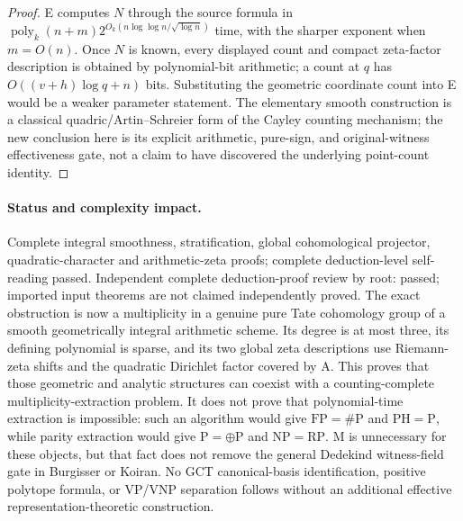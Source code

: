 \begin{proof}
E computes $N$ through the source formula in $\operatorname{poly}_k(n+m)2^{O_k(n\log\log n/\sqrt{\log n})}$ time, with the sharper exponent when $m=O(n)$. Once $N$ is known, every displayed count and compact zeta-factor description is obtained by polynomial-bit arithmetic; a count at $q$ has $O((v+h)\log q+n)$ bits. Substituting the geometric coordinate count into E would be a weaker parameter statement. The elementary smooth construction is a classical quadric/Artin--Schreier form of the Cayley counting mechanism; the new conclusion here is its explicit arithmetic, pure-sign, and original-witness effectiveness gate, not a claim to have discovered the underlying point-count identity.
\end{proof}
\paragraph{Status and complexity impact.}
Complete integral smoothness, stratification, global cohomological projector, quadratic-character and arithmetic-zeta proofs; complete deduction-level self-reading passed. Independent complete deduction-proof review by root: passed; imported input theorems are not claimed independently proved. The exact obstruction is now a multiplicity in a genuine pure Tate cohomology group of a smooth geometrically integral arithmetic scheme. Its degree is at most three, its defining polynomial is sparse, and its two global zeta descriptions use Riemann-zeta shifts and the quadratic Dirichlet factor covered by A. This proves that those geometric and analytic structures can coexist with a counting-complete multiplicity-extraction problem. It does not prove that polynomial-time extraction is impossible: such an algorithm would give $\mathrm{FP}=\#\mathrm P$ and $\mathrm{PH}=\mathrm P$, while parity extraction would give $\mathrm P=\oplus\mathrm P$ and $\mathrm{NP}=\mathrm{RP}$. M is unnecessary for these objects, but that fact does not remove the general Dedekind witness-field gate in Burgisser or Koiran. No GCT canonical-basis identification, positive polytope formula, or VP/VNP separation follows without an additional effective representation-theoretic construction.

